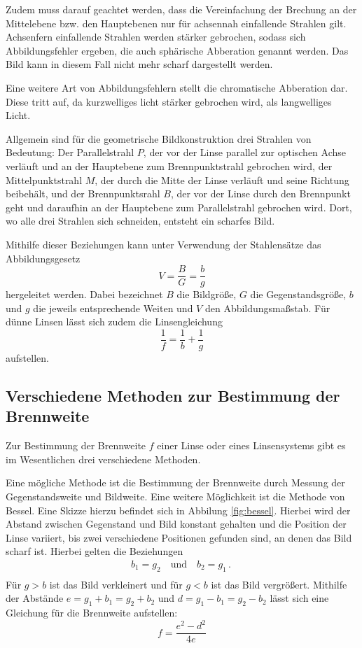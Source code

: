 Zudem muss darauf geachtet werden, dass die Vereinfachung der Brechung an der
Mittelebene bzw. den Hauptebenen nur für achsennah einfallende Strahlen gilt. Achsenfern
einfallende Strahlen werden stärker gebrochen, sodass sich Abbildungsfehler ergeben,
die auch sphärische Abberation genannt werden. Das Bild kann in diesem Fall nicht mehr scharf
dargestellt werden.

Eine weitere Art von Abbildungsfehlern stellt die chromatische Abberation dar. Diese
tritt auf, da kurzwelliges licht stärker gebrochen wird, als langwelliges Licht.

Allgemein sind für die geometrische Bildkonstruktion drei Strahlen von Bedeutung:
Der Parallelstrahl $P$, der vor der Linse parallel zur optischen Achse verläuft und an
der Hauptebene zum Brennpunktstrahl gebrochen wird, der Mittelpunktstrahl $M$, der
durch die Mitte der Linse verläuft und seine Richtung beibehält, und der Brennpunktsrahl
$B$, der vor der Linse durch den Brennpunkt geht und daraufhin an der Hauptebene zum Parallelstrahl
gebrochen wird. Dort, wo alle drei Strahlen sich schneiden, entsteht ein scharfes Bild.

Mithilfe dieser Beziehungen kann unter Verwendung der Stahlensätze das Abbildungsgesetz
\begin{equation}
  V=\frac{B}{G}=\frac{b}{g}
  \label{eqn:V}
\end{equation}
hergeleitet werden. Dabei bezeichnet $B$ die Bildgröße, $G$ die Gegenstandsgröße,
$b$ und $g$ die jeweils entsprechende Weiten und $V$ den Abbildungsmaßstab.
Für dünne Linsen lässt sich zudem die Linsengleichung
\begin{equation}
  \frac{1}{f}=\frac{1}{b}+\frac{1}{g}
  \label{eqn:linsengleichung}
\end{equation}
aufstellen.


\subsection{Verschiedene Methoden zur Bestimmung der Brennweite}
\label{subsec:Methoden}

Zur Bestimmung der Brennweite $f$ einer Linse oder eines Linsensystems gibt es im
Wesentlichen drei verschiedene Methoden.

Eine mögliche Methode ist die Bestimmung der Brennweite durch Messung der Gegenstandsweite
und Bildweite.
Eine weitere Möglichkeit ist die Methode von Bessel. Eine Skizze hierzu befindet sich in
Abbilung \ref{fig:bessel}. Hierbei wird der Abstand zwischen
Gegenstand und Bild konstant gehalten und die Position der Linse variiert, bis zwei
verschiedene Positionen gefunden sind, an denen das Bild scharf ist. Hierbei gelten die
Beziehungen
\begin{align}
  b_1=g_2 \quad \text{und} \quad b_2=g_1\,.\ \\
  \label{eqn:d}
\end{align}
Für $g>b$ ist das Bild verkleinert und für $g<b$ ist das Bild vergrößert. Mithilfe der
Abstände $e=g_1+b_1=g_2+b_2$ und $d=g_1-b_1=g_2-b_2$ lässt sich eine Gleichung für die
Brennweite aufstellen:
\begin{equation}
  f=\frac{e^2-d^2}{4e}
  \label{eqn:bessel}
\end{equation}

